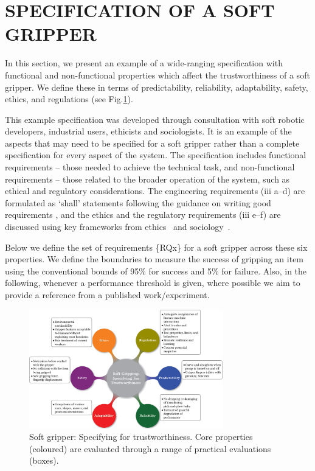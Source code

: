 \documentclass[letterpaper, 10 pt, conference]{ieeeconf}  %
\begin{document}
\section{SPECIFICATION OF A SOFT GRIPPER}\label{specification-gripper}
	In this section, we present an example of a wide-ranging specification with functional and non-functional properties which affect the trustworthiness of a soft gripper. We define these in terms of predictability, reliability, adaptability, safety, ethics, and regulations (see Fig.\ref{SR-spec}). 
	
	This example specification was developed through consultation with soft robotic developers, industrial users, ethicists and sociologists. It is an example of the aspects that may need to be specified for a soft gripper rather than a complete specification for every aspect of the system. The specification includes functional requirements -- those needed to achieve the technical task, and non-functional requirements -- those related to the broader operation of the system, such as ethical and regulatory considerations. %
	The engineering requirements (iii a--d) are formulated as `shall' statements following the guidance on writing good requirements \cite{NASA2007}, and the ethics and the regulatory requirements (iii e--f) are discussed using key frameworks from ethics~\cite{Porter2023} and sociology~\cite{Macrae2022}. 
	
	Below we define the set of requirements \{RQx\} for a soft gripper across these six properties.
	We define the boundaries to measure the success of gripping an item using the conventional bounds of 95\% for success and 5\% for failure. 
	Also, in the following, whenever a performance threshold is given, where possible we aim to provide a reference from a published work/experiment. 
	\begin{figure}
		\centering
		\includegraphics[width=0.75\textwidth]{figures/properties}%
		\caption{Soft gripper: Specifying for trustworthiness. Core properties (coloured) are evaluated through a range of practical evaluations (boxes). }
		\label{SR-spec}
	\end{figure}
	
\end{document}
